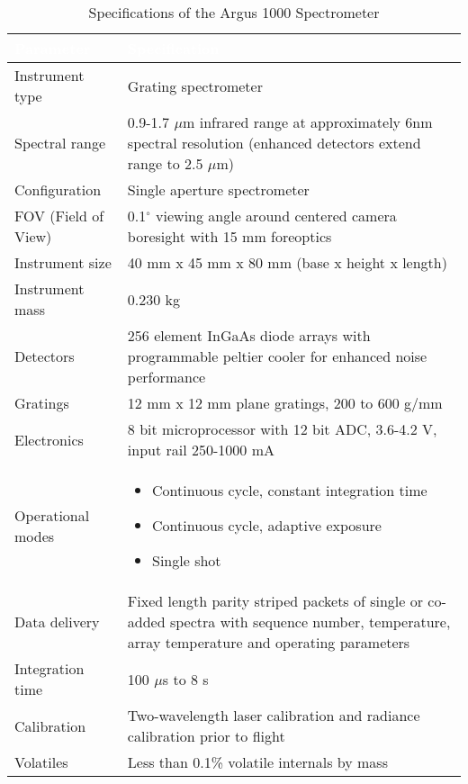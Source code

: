 \documentclass[nocover]            %
{CSLI}                       %
\begin{document}
\begin{table}[H]

\caption{Specifications of the Argus 1000 Spectrometer \cite{Toth}}

\begin{tabular}{|l|p{9.5cm}|}
\arrayrulecolor{white}
\hline
\rowcolor{gray!80}
\textcolor{white}{\textbf{Parameter}} & \textcolor{white}{\textbf{Specification}} \\ \hline
\rowcolor{gray!10}
Instrument type & Grating spectrometer \\ \hline
\rowcolor{gray!5}
Spectral range & 0.9-1.7 $\mu$m infrared range at approximately  6nm spectral resolution (enhanced detectors extend range to 2.5 $\mu$m) \\ \hline
\rowcolor{gray!10}
Configuration & Single aperture spectrometer \\ \hline
\rowcolor{gray!5}
FOV (Field of View) & 0.1$^\circ$ viewing angle around centered camera boresight with 15 mm foreoptics \\ \hline
\rowcolor{gray!10}
Instrument size & 40 mm x 45 mm x 80 mm (base x height x length)\\ \hline
\rowcolor{gray!5}
Instrument mass & 0.230 kg \\ \hline
\rowcolor{gray!10}
Detectors & 256 element InGaAs diode arrays with programmable peltier cooler for enhanced noise performance \\ \hline
\rowcolor{gray!5}
Gratings & 12 mm x 12 mm plane gratings, 200 to 600 g/mm\\ \hline
\rowcolor{gray!10}
Electronics & 8 bit microprocessor with 12 bit ADC, 3.6-4.2 V,  input rail 250-1000 mA\\ \hline
\rowcolor{gray!5}
Operational modes &
\vspace{-0.75cm}
\begin{itemize}
\item Continuous cycle, constant integration time
\item Continuous cycle, adaptive exposure
\item Single shot
\vspace{-0.5cm}
\end{itemize}
\\ \hline
\rowcolor{gray!10}
Data delivery & Fixed length parity striped packets of single or co-added spectra with
sequence number, temperature, array temperature and operating parameters\\ \hline
\rowcolor{gray!5}
Integration time & 100 $\mu$s to 8 s \\ \hline
\rowcolor{gray!10}
Calibration & Two-wavelength laser calibration and radiance calibration prior to flight \\ \hline
\rowcolor{gray!5}
Volatiles & Less than 0.1\% volatile internals by mass \\ \hline
\end{tabular}
\end{table}
\newpage
\end{document}
